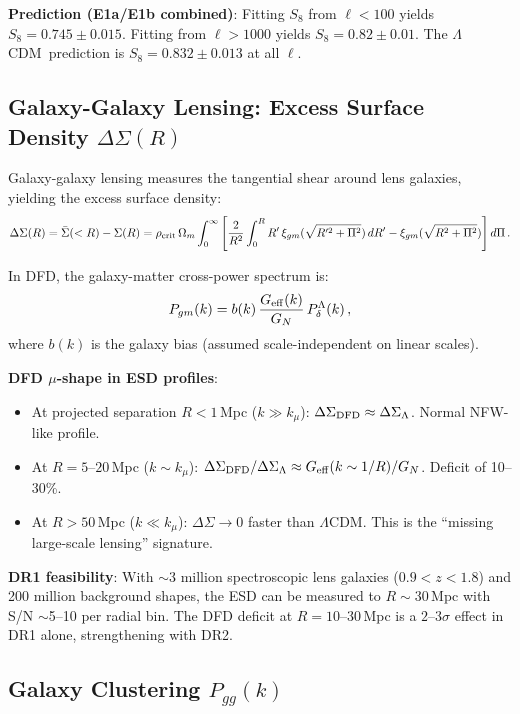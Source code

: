\documentclass[11pt,a4paper]{article}
\newcommand{\LCDM}{$\Lambda$CDM}
\newcommand{\kmu}{k_\mu}
\newcommand{\Geff}{G_{\rm eff}}
\begin{document}
\textbf{Prediction (E1a/E1b combined)}: Fitting $S_8$ from $\ell < 100$
yields $S_8 = 0.745 \pm 0.015$. Fitting from $\ell > 1000$ yields
$S_8 = 0.82 \pm 0.01$. The \LCDM\ prediction is $S_8 = 0.832 \pm 0.013$
at all $\ell$.


\subsection{Galaxy-Galaxy Lensing: Excess Surface Density $\Delta\Sigma(R)$}

Galaxy-galaxy lensing measures the tangential shear around lens galaxies,
yielding the excess surface density:
\begin{equation}
\Delta\Sigma(R) = \bar{\Sigma}(< R) - \Sigma(R)
  = \rho_{\rm crit}\,\Omega_m\int_0^\infty
  \left[\frac{2}{R^2}\int_0^R R'\,\xi_{gm}(\sqrt{R'^2+\Pi^2})\,dR'
  - \xi_{gm}(\sqrt{R^2+\Pi^2})\right] d\Pi\,.
\end{equation}

In DFD, the galaxy-matter cross-power spectrum is:
\begin{equation}
P_{gm}(k) = b(k)\,\frac{\Geff(k)}{G_N}\,P_{\delta}^{\Lambda}(k)\,,
\end{equation}
where $b(k)$ is the galaxy bias (assumed scale-independent on linear
scales).

\textbf{DFD $\mu$-shape in ESD profiles}:
\begin{itemize}[nosep]
\item At projected separation $R < 1$\,Mpc ($k \gg \kmu$):
  $\Delta\Sigma_{\rm DFD} \approx \Delta\Sigma_\Lambda$.
  Normal NFW-like profile.
\item At $R = 5$--$20$\,Mpc ($k \sim \kmu$):
  $\Delta\Sigma_{\rm DFD}/\Delta\Sigma_\Lambda \approx
  \Geff(k\sim 1/R)/G_N$. Deficit of 10--30\%.
\item At $R > 50$\,Mpc ($k \ll \kmu$): $\Delta\Sigma \to 0$ faster
  than \LCDM. This is the ``missing large-scale lensing'' signature.
\end{itemize}

\textbf{DR1 feasibility}: With $\sim$3 million spectroscopic lens
galaxies ($0.9 < z < 1.8$) and 200 million background shapes, the
ESD can be measured to $R \sim 30$\,Mpc with S/N $\sim$5--10 per
radial bin. The DFD deficit at $R = 10$--$30$\,Mpc is a $2$--$3\sigma$
effect in DR1 alone, strengthening with DR2.


\subsection{Galaxy Clustering $P_{gg}(k)$}
\end{document}
